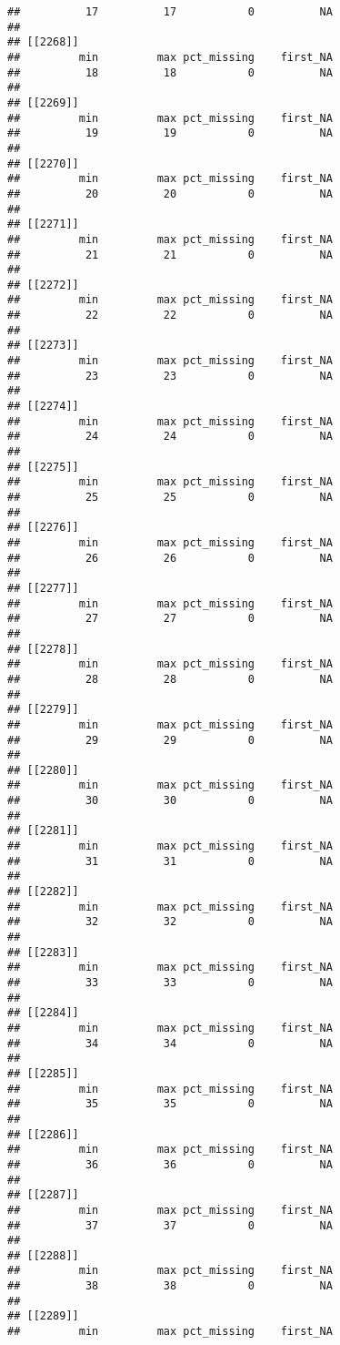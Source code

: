 \documentclass[
]{article}
\begin{document}
\begin{verbatim}
##          17          17           0          NA 
## 
## [[2268]]
##         min         max pct_missing    first_NA 
##          18          18           0          NA 
## 
## [[2269]]
##         min         max pct_missing    first_NA 
##          19          19           0          NA 
## 
## [[2270]]
##         min         max pct_missing    first_NA 
##          20          20           0          NA 
## 
## [[2271]]
##         min         max pct_missing    first_NA 
##          21          21           0          NA 
## 
## [[2272]]
##         min         max pct_missing    first_NA 
##          22          22           0          NA 
## 
## [[2273]]
##         min         max pct_missing    first_NA 
##          23          23           0          NA 
## 
## [[2274]]
##         min         max pct_missing    first_NA 
##          24          24           0          NA 
## 
## [[2275]]
##         min         max pct_missing    first_NA 
##          25          25           0          NA 
## 
## [[2276]]
##         min         max pct_missing    first_NA 
##          26          26           0          NA 
## 
## [[2277]]
##         min         max pct_missing    first_NA 
##          27          27           0          NA 
## 
## [[2278]]
##         min         max pct_missing    first_NA 
##          28          28           0          NA 
## 
## [[2279]]
##         min         max pct_missing    first_NA 
##          29          29           0          NA 
## 
## [[2280]]
##         min         max pct_missing    first_NA 
##          30          30           0          NA 
## 
## [[2281]]
##         min         max pct_missing    first_NA 
##          31          31           0          NA 
## 
## [[2282]]
##         min         max pct_missing    first_NA 
##          32          32           0          NA 
## 
## [[2283]]
##         min         max pct_missing    first_NA 
##          33          33           0          NA 
## 
## [[2284]]
##         min         max pct_missing    first_NA 
##          34          34           0          NA 
## 
## [[2285]]
##         min         max pct_missing    first_NA 
##          35          35           0          NA 
## 
## [[2286]]
##         min         max pct_missing    first_NA 
##          36          36           0          NA 
## 
## [[2287]]
##         min         max pct_missing    first_NA 
##          37          37           0          NA 
## 
## [[2288]]
##         min         max pct_missing    first_NA 
##          38          38           0          NA 
## 
## [[2289]]
##         min         max pct_missing    first_NA 

\end{verbatim}
\end{document}
